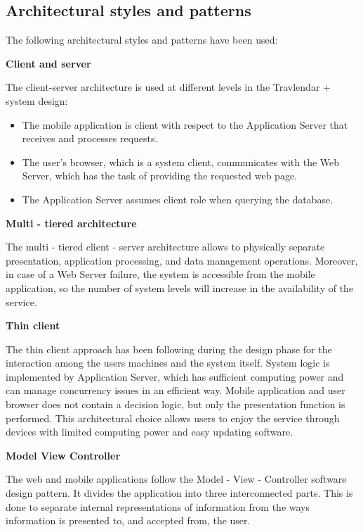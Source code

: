 \documentclass{article}
\begin{document}
	\subsection{Architectural styles and patterns}
	The following architectural styles and patterns have been used:
	
	\bigskip
	\noindent
	\textbf{Client and server}
	
	\bigskip
	\noindent
	The client-server architecture is used at different levels in the Travlendar + system design:
	\begin{itemize}
	\item The mobile application is client with respect to the Application Server that receives and processes requests.
	\item The user’s browser, which is a system client, communicates with the Web Server, which has the task of providing the requested web page.
	\item The Application Server assumes client  role when querying the database.
	\end{itemize}	

	\bigskip
	\noindent
	\textbf{Multi - tiered architecture}
	
	\bigskip
	\noindent
	The multi - tiered client - server architecture allows to physically separate presentation, application processing, and data management operations.
	Moreover, in case of a Web Server failure, the system is accessible from the mobile application, so the number of system levels will increase in the availability of the service.

	\bigskip
	\noindent
	\textbf{Thin client}

	\bigskip
	\noindent
	The thin client approach has been following during the design phase for  the interaction among the users machines and the system itself.
	System logic is implemented by Application Server, which has sufficient computing power and can manage concurrency issues in an efficient way.
	Mobile application and user browser does not contain a decision logic, but only the presentation function is performed.
	This architectural choice allows users to enjoy the service through devices with limited computing power and easy updating software.

	\bigskip
	\noindent
	\textbf{Model View Controller}

	\bigskip
	\noindent
	The web and mobile applications follow the Model - View - Controller software design pattern.
	It divides the application into three interconnected parts. This is done to separate internal representations of information from the ways information is presented to, and accepted from, the user.
\end{document}
